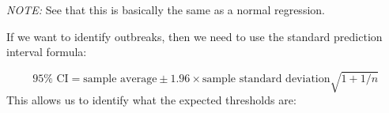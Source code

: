 \documentclass[]{book}
\newenvironment{Shaded}{\begin{snugshade}}{\end{snugshade}}
\newcommand{\KeywordTok}[1]{\textcolor[rgb]{0.13,0.29,0.53}{\textbf{#1}}}
\newcommand{\DataTypeTok}[1]{\textcolor[rgb]{0.13,0.29,0.53}{#1}}
\newcommand{\DecValTok}[1]{\textcolor[rgb]{0.00,0.00,0.81}{#1}}
\newcommand{\StringTok}[1]{\textcolor[rgb]{0.31,0.60,0.02}{#1}}
\newcommand{\OperatorTok}[1]{\textcolor[rgb]{0.81,0.36,0.00}{\textbf{#1}}}
\newcommand{\ErrorTok}[1]{\textcolor[rgb]{0.64,0.00,0.00}{\textbf{#1}}}
\newcommand{\NormalTok}[1]{#1}
\begin{document}
\emph{NOTE:} See that this is basically the same as a normal regression.

If we want to identify outbreaks, then we need to use the standard
prediction interval formula:

\[
95\% \text{ CI} = \text{sample average} \pm 1.96 \times \text{sample standard deviation} \sqrt{ 1 + 1 / n}
\] This allows us to identify what the expected thresholds are:

\begin{Shaded}
\end{Shaded}
\end{document}
